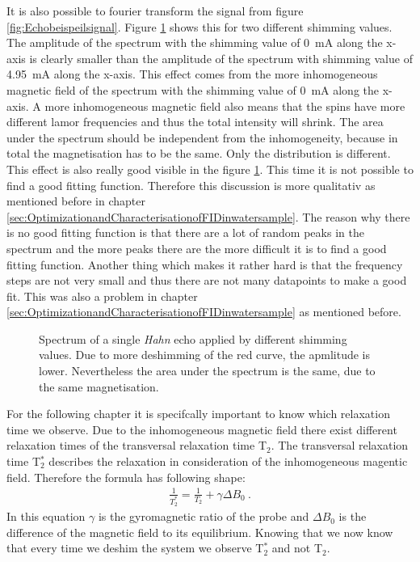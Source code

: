 It is also possible to fourier transform the signal from figure \ref{fig:Echobeispeilsignal}. Figure \ref{fig:SpinEcho} shows this for two different shimming values. The amplitude of the spectrum with the shimming value of \SI{0}{\milli \ampere} along the x-axis is clearly smaller than the amplitude of the spectrum with shimming value of \SI{4.95}{\milli \ampere} along the x-axis. This effect comes from the more inhomogeneous magnetic field of the spectrum with the shimming value of \SI{0}{\milli \ampere} along the x-axis. A more inhomogeneous magnetic field also means that the spins have more different lamor frequencies and thus the total intensity will shrink. The area under the spectrum should be independent from the inhomogeneity, because in total the magnetisation has to be the same. Only the distribution is different. This effect is also really good visible in the figure \ref{fig:SpinEcho}. This time it is not possible to find a good fitting function. Therefore this discussion is more qualitativ as mentioned before in chapter \ref{sec:OptimizationandCharacterisationofFIDinwatersample}. The reason why there is no good fitting function is that there are a lot of random peaks in the spectrum and the more peaks there are the more difficult it is to find a good fitting function. Another thing which makes it rather hard is that the frequency steps are not very small and thus there are not many datapoints to make a good fit. This was also a problem in chapter \ref{sec:OptimizationandCharacterisationofFIDinwatersample} as mentioned before.
\begin{figure}[H]
    \centering
    
    \caption[Spectrum of a single \textit{Hahn} echo applied by different shimming values.]{Spectrum of a single \textit{Hahn} echo applied by different shimming values. Due to more deshimming of the red curve, the apmlitude is lower. Nevertheless the area under the spectrum is the same, due to the same magnetisation.}
    \label{fig:SpinEcho}
\end{figure}
For the following chapter it is specifcally important to know which relaxation time we observe. Due to the inhomogeneous magnetic field there exist different relaxation times of the transversal relaxation time T$_2$. The transversal relaxation time T$_2^*$ describes the relaxation in consideration of the inhomogeneous magentic field. Therefore the formula has following shape:
\begin{align}
    \frac{1}{T_2^*} = \frac{1}{T_2} + \gamma \Delta B_0 \ .
    \label{eq:T2_star}
\end{align}
In this equation $\gamma$ is the gyromagnetic ratio of the probe and $\Delta B_0$ is the difference of the magnetic field to its equilibrium. Knowing that we now know that every time we deshim the system we observe T$_2^*$ and not T$_2$.
